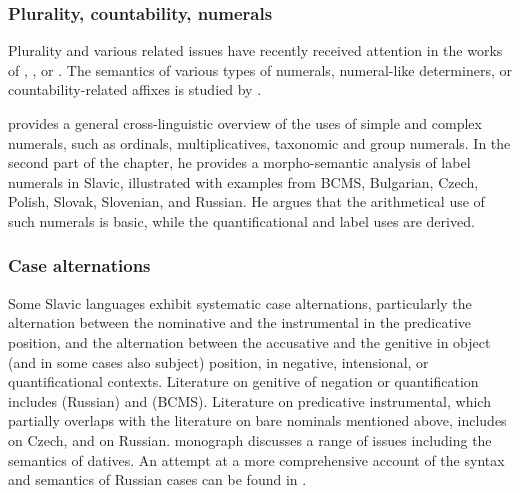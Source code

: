 \documentclass[output=paper,colorlinks,citecolor=brown]{langscibook}
\begin{document}
%
%
%
\subsubsection{Plurality, countability, numerals%
} Plurality and various related issues have recently received attention in the works of \citet{wagiel15a}, \citet{grimm-docekal21}, or \citet{Butschety2025}. The semantics of various types of numerals, numeral-like determiners, or countability-related affixes is studied by \citet{ionin_matushansky2006composition,docekal12,wagiel15,wagiel20,wagiel21,docekal-wagiel18,Khrizman21,Geist.etal2023}.

 provides a general cross-linguistic overview of the uses of simple and complex numerals, such as ordinals, multiplicatives, taxonomic and group numerals. In the second part of the chapter, he provides a morpho-semantic analysis of label numerals in Slavic, illustrated with examples from BCMS, Bulgarian, Czech, Polish, Slovak, Slovenian, and Russian. He argues that the arithmetical use of such numerals is basic, while the quantificational and label uses are derived. 

\subsubsection{Case alternations} Some Slavic languages exhibit systematic case alternations, particularly the alternation between the nominative and the instrumental in the predicative position, and the alternation between the accusative and the genitive in object (and in some cases also subject) position, in negative, intensional, or quantificational contexts. Literature on genitive of negation or quantification includes \citet{pereltsvaig99,partee-borschev02,partee-borschev04,kagan07,kagan13,Khrizman2014,geist15} (Russian) and \citet{Husic.Renans2022} (BCMS). Literature on predicative instrumental, which partially overlaps with the literature on bare nominals mentioned above, includes \citet{filip01,Filip2005} on Czech, and \citet{Pereltsvaig2006,geist08a,bogatyreva11,bogatyreva-espinal14} on Russian.  monograph discusses a range of issues including the semantics of datives. An attempt at a more comprehensive account of the syntax and semantics of Russian cases can be found in \citet{zimmermann2003}.
\end{document}
